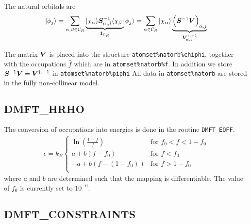 \documentclass[11pt,a4paper]{report}
\begin{document}
The natural orbitals are
\begin{eqnarray}
|\phi_j\rangle=\sum_{\alpha,\beta\in\mathcal{C}_R}
\underbrace{|\chi_\alpha\rangle
\bm{S}^{-1}_{\alpha,\beta}\langle\chi_\beta|}_{\bm{1}_{\mathcal{C}_R}}
\phi_j\rangle
=\sum_{\alpha\in\mathcal{C}_R}|\chi_\alpha\rangle
\underbrace{\Bigl(\bm{S}^{-1}\bm{V}\Bigr)_{\alpha,j}}_{\bm{V}^{\dagger,-1}_{\alpha,j}}
\end{eqnarray}

The matrix $\bm{V}$ is placed into the structure
\verb|atomset%natorb%chiphi|, together with the occupations $\bar{f}$
which are in \verb|atomset%natorb%f|. In addition we store
$\bm{S}^{-1}\bm{V}=\bm{V}^{\dagger,-1}$ in
\verb|atomset%natorb%piphi| All data in \verb|atomset%natorb| are
stored in the fully non-collinear model.

\subsection{DMFT\_HRHO}
The conversion of occupations into energies is done in the routine
\verb|DMFT_EOFF|.
\begin{eqnarray}
\epsilon=k_B
\begin{cases}
\ln\left(\frac{1-f}{f}\right) &\text{for $f_0<f<1-f_0$}\\
a+b(f-f_0)&\text{for $f<f_0$}\\
-a+b(f-(1-f_0))&\text{for $f>1-f_0$}\\
\end{cases}
\end{eqnarray}
where $a$ and $b$ are determined such that the mapping is
differentiable. The value of $f_0$ is currently set to $10^{-6}$.

\subsection{DMFT\_CONSTRAINTS}
\label{sec:routinedmftconstraints}
\end{document}
